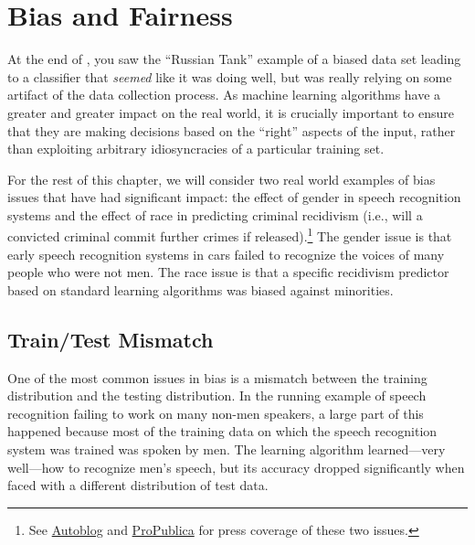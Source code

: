 \chapter{Bias and Fairness} \label{sec:bias}


\begin{learningobjectives}
\item
\end{learningobjectives}




At the end of , you saw the ``Russian Tank'' example of a biased data set leading to a classifier that \emph{seemed} like it was doing well, but was really relying on some artifact of the data collection process.
As machine learning algorithms have a greater and greater impact on the real world, it is crucially important to ensure that they are making decisions based on the ``right'' aspects of the input, rather than exploiting arbitrary idiosyncracies of a particular training set.

For the rest of this chapter, we will consider two real world examples of bias issues that have had significant impact: the effect of gender in speech recognition systems and the effect of race in predicting criminal recidivism (i.e., will a convicted criminal commit further crimes if released).\footnote{See \href{http://www.autoblog.com/2011/05/31/women-voice-command-systems/}{Autoblog} and \href{http://www.propublica.org/article/machine-bias-risk-assessments-in-criminal-sentencing}{ProPublica} for press coverage of these two issues.} The gender issue is that early speech recognition systems in cars failed to recognize the voices of many people who were not men. The race issue is that a specific recidivism predictor based on standard learning algorithms was biased against minorities.

\section{Train/Test Mismatch}

One of the most common issues in bias is a mismatch between the training distribution and the testing distribution.
In the running example of speech recognition failing to work on many non-men speakers, a large part of this happened because most of the training data on which the speech recognition system was trained was spoken by men.
The learning algorithm learned---very well---how to recognize men's speech, but its accuracy dropped significantly when faced with a different distribution of test data.

